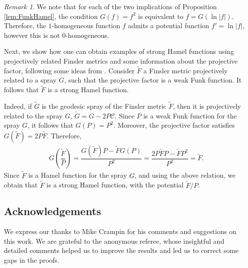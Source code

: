 \documentclass[oneside,english]{amsart}
\theoremstyle{definition}
\theoremstyle{plain}
\theoremstyle{plain}
\theoremstyle{plain}
\theoremstyle{remark}
\newtheorem{rem}[theorem]{Remark}
\theoremstyle{remark}
\theoremstyle{remark}
\begin{document}
\begin{rem}
We note that for each of the two implications of Proposition \ref{lem:FunkHamel}, the condition $G(f)=f^2$ is equivalent to $f=G(\ln |f|)$. Therefore, the $1$-homogeneous function $f$ admits a potential function $f'=\ln |f|$, however this is not $0$-homogeneous. 
\end{rem} 
 
Next, we show how one can obtain examples of strong Hamel functions using projectively related Finsler metrics and some information about the projective factor, following some ideas from  \cite{Cretu20}. Consider $\widetilde{F}$ a Finsler metric projectively related to a spray $G$, such that the projective factor is a weak Funk function. It follows that $\widetilde{F}$ is a strong Hamel function.

Indeed, if $\widetilde{G}$ is the geodesic spray of the Finsler metric $\widetilde{F}$, then it is projectively related to the spray $G$, $\widetilde{G}=G-2P\mathcal{C}$. Since $P$ is a weak Funk function for the spray $G$, it follows that $G(P)=P^2$. Moreover, the projective factor satisfies $G(\widetilde{F})=2P\widetilde{F}$. Therefore, 
\begin{eqnarray*}
G\left(\dfrac{\widetilde{F}}{P}\right)=\dfrac{G(\widetilde{F})P - \widetilde{F} G(P)}{P^2}= \dfrac{2P\widetilde{F}P - \widetilde{F} P^2}{P^2} = \widetilde{F}.
\end{eqnarray*}
Since $\widetilde{F}$ is a Hamel function for the spray $G$, and using the above relation, we obtain that $\widetilde{F}$ is a strong Hamel function, with the potential $\widetilde{F}/P$. 


\subsection*{Acknowledgements} We express our thanks to Mike Crampin for his comments and suggestions on this work. We are grateful to the anonymous referee, whose insightful and detailed comments helped us to improve the results and led us to correct some gaps in the proofs.   
\end{document}
